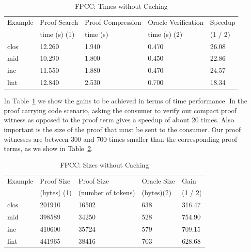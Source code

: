 \documentclass{acmconf}
\begin{document}
\begin{table}[htbp]
\begin{center}
\begin{small}
\begin{tabular}{|l|l|l|l|l|}
\hline
Example & Proof Search & Proof Compression & Oracle Verification & Speedup\\
& time (s) (1) & time (s) & time (s) (2) & (1 / 2) \\
\hline
clos & 12.260 & 1.940 & 0.470 & 26.08\\
mid & 10.290 & 1.800 & 0.450 & 22.86\\
inc & 11.550 & 1.880 & 0.470 & 24.57\\
lint & 12.840 & 2.530 & 0.700 & 18.34\\
\hline
\end{tabular}
\end{small}
\end{center}
\caption{\label{tab:fpcctimes}
FPCC: Times without Caching}
\end{table}

In Table~\ref{tab:fpcctimes} we show the gains to be achieved in terms of
time performance. In the proof carrying code scenario, asking the consumer
to verify our compact proof witness as opposed to the proof term gives a 
speedup of about 20 times. Also important is the size of the proof that
must be sent to the consumer. Our proof witnesses are between 300 and 700
times smaller than the corresponding proof terms, as we show in
Table~\ref{tab:fpccsizes}.

\begin{table}[htbp]
\begin{center}
\begin{small}
\begin{tabular}{|l|l|l|l|l|}
\hline
Example & Proof Size & Proof Size & Oracle Size & Gain \\
& (bytes) (1) & (number of tokens) & (bytes)(2) & (1 / 2)\\
\hline
clos & 201910 & 16502 & 638 & 316.47\\
mid & 398589 & 34250 & 528 & 754.90\\
inc & 410600 & 35724 & 579 & 709.15\\
lint & 441965 & 38416 & 703 & 628.68\\
\hline
\end{tabular}
\end{small}
\end{center}
\caption{\label{tab:fpccsizes}
FPCC: Sizes without Caching}
\end{table}
\end{document}

